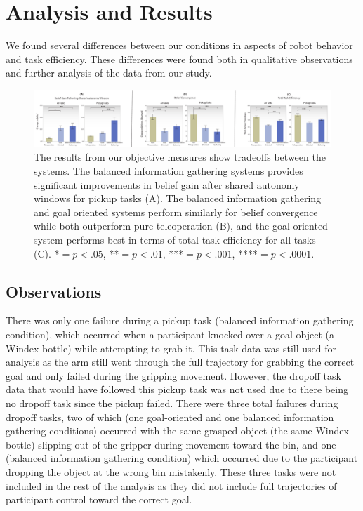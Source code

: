 \documentclass[conference]{IEEEtran}
\begin{document}
\section{Analysis and Results}

We found several differences between our conditions in aspects of robot behavior and task efficiency. These differences were found both in qualitative observations and further analysis of the data from our study.

\begin{figure}
\includegraphics[width=\textwidth]{figures/CR_All_Measures.pdf}
\caption{The results from our objective measures show tradeoffs between the systems. The balanced information gathering systems provides significant improvements in belief gain after shared autonomy windows for pickup tasks (A). The balanced information gathering and goal oriented systems perform similarly for belief convergence while both outperform pure teleoperation (B), and the goal oriented system performs best in terms of total task efficiency for all tasks (C). *$= p < .05$, **$= p < .01$, ***$= p < .001$, ****$= p < .0001$.}
\label{picture_results}
\end{figure}

\subsection{Observations}
There was only one failure during a pickup task (balanced information gathering condition), which occurred when a participant knocked over a goal object (a Windex bottle) while attempting to grab it. This task data was still used for analysis as the arm still went through the full trajectory for grabbing the correct goal and only failed during the gripping movement. However, the dropoff task data that would have followed this pickup task was not used due to there being no dropoff task since the pickup failed. There were three total failures during dropoff tasks, two of which (one goal-oriented and one balanced information gathering conditions) occurred with the same grasped object (the same Windex bottle) slipping out of the gripper during movement toward the bin, and one (balanced information gathering condition) which occurred due to the participant dropping the object at the wrong bin mistakenly. These three tasks were not included in the rest of the analysis as they did not include full trajectories of participant control toward the correct goal.
\end{document}
